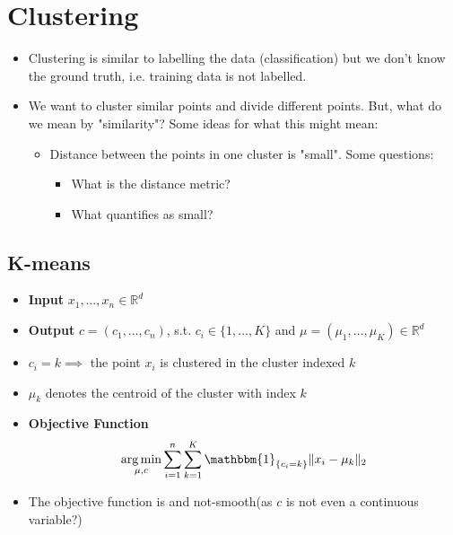 \documentclass{article}
\begin{document}
\hrfullline
\newpage

\section{Clustering}

\begin{itemize}
    \item Clustering is similar to labelling the data (classification) but we don't know the ground truth, i.e. training data is not labelled.
    \item We want to cluster similar points and divide different points. But, what do we mean by "similarity"? Some ideas for what this might mean:
        \begin{itemize}
            \item Distance between the points in one cluster is "small". Some questions:
                \begin{itemize}
                    \item What is the distance metric?
                    \item What quantifies as small?
                \end{itemize}
        \end{itemize}
\end{itemize}


\subsection{K-means}

\begin{itemize}
    \item \textbf{Input} $x_1, \dots, x_n \in \mathbb{R}^d$
    \item \textbf{Output} $c=(c_1, \dots, c_n)$, s.t. $c_i \in \{1, \dots, K\}$ and $\mu=(\mu_1, \dots, \mu_K) \in \mathbb{R}^d$
    \item $c_i=k \implies$ the point $x_i$ is clustered in the cluster indexed $k$
    \item $\mu_k$ denotes the centroid of the cluster with index $k$
    \item \textbf{Objective Function} $$\argmin_{\mu, c} \sum_{i=1}^n \sum_{k=1}^K \mathbbm{1}_{\{c_i=k\}} \Vert x_i-\mu_k \Vert_2$$
    \item The objective function is  and not-smooth(as $c$ is not even a continuous variable?)
\end{itemize}
\end{document}
